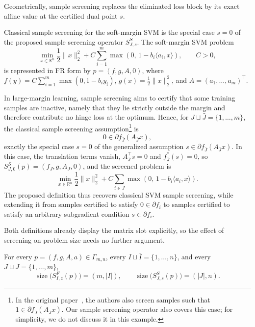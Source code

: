 Geometrically, sample screening replaces the eliminated loss block by
its exact affine value at the certified dual point \(s\).

\begin{example}
\label{ex:svm-sample}
Classical sample screening for the soft-margin SVM is the special case
\(s=0\) of the proposed sample screening operator \(S^S_{J,s}\). The
soft-margin SVM problem
\[
\min_{x\in\mathbb R^n}
\frac12\|x\|_2^2
+
C\sum_{i=1}^m
\max\!\left(0,\,1-b_i\langle a_i,x\rangle\right),
\qquad C>0,
\]
is represented in FR form by \(p=(f,g,A,0)\), where
\(f(y)=C\sum_{i=1}^m\max(0,1-b_i y_i)\), \(g(x)=\frac12\|x\|_2^2\), and
\(A=(a_1,\ldots,a_m)^\top\).

In large-margin learning, sample screening aims to certify that some
training samples are inactive, namely that they lie strictly outside
the margin and therefore contribute no hinge loss at the optimum.
Hence, for \(J\sqcup\bar J=\{1,\ldots,m\}\), the classical sample
screening assumption\footnote{In the original paper~\cite{ogawa2013}, the authors also screen samples such that \(1\in\partial f_{\bar J}(A_{\bar J}x)\). Our sample screening operator also covers this case; for simplicity, we do not discuss it in this example.} is
\[
0\in\partial f_{\bar J}(A_{\bar J}x),
\]
exactly the special case \(s=0\) of the generalized assumption
\(s\in\partial f_{\bar J}(A_{\bar J}x)\). In this case, the translation
terms vanish, \(A_{\bar J}^{\top}s=0\) and \(f_{\bar J}^*(s)=0\), so
\(S^S_{J,0}(p)=(f_J,g,A_J,0)\), and the screened problem is
\[
\min_{x\in\mathbb R^n}
\frac12\|x\|_2^2
+
C\sum_{i\in J}
\max\!\left(0,\,1-b_i\langle a_i,x\rangle\right).
\]
The proposed definition thus recovers classical SVM sample screening,
while extending it from samples certified to satisfy \(0\in\partial
f_i\) to samples certified to satisfy an arbitrary subgradient
condition \(s\in\partial f_i\).
\end{example}

Both definitions already display the matrix slot explicitly, so the
effect of screening on problem size needs no further argument.

\begin{corollary}
\label{cor:complexity}
For every \(p=(f,g,A,a)\in\Gamma_{m,n}\), every
\(I\sqcup\bar I=\{1,\ldots,n\}\), and every \(J\sqcup\bar J=\{1,\ldots,m\}\),
\[
\operatorname{size}\bigl(S^F_{I,z}(p)\bigr)=(m,|I|),
\qquad
\operatorname{size}\bigl(S^S_{J,s}(p)\bigr)=(|J|,n).
\]
\end{corollary}

